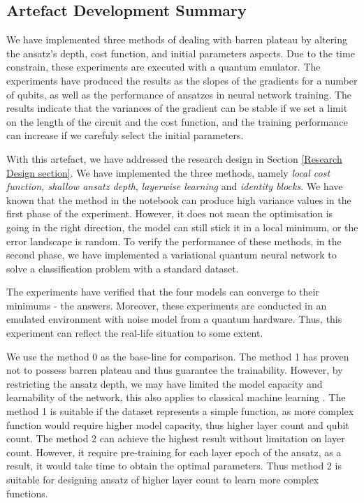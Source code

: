 \subsection{Artefact Development Summary}
We have implemented three methods of dealing with barren plateau by altering the ansatz's depth, cost function, and initial parameters aspects.
Due to the time constrain, these experiments are executed with a quantum emulator.
The experiments have produced the results as the slopes of the gradients for a number of qubits, as well as the performance of ansatzes in neural network training.
The results indicate that the variances of the gradient can be stable if we set a limit on the length of the circuit and the cost function, and the training performance can increase if we carefuly select the initial parameters.

With this artefact, we have addressed the research design in Section \ref{Research Design section}.
We have implemented the three methods, namely \textit{local cost function, shallow ansatz depth}, \textit{layerwise learning} and \textit{identity blocks}.
We have known that the method in the notebook can produce high variance values in the first phase of the experiment.
However, it does not mean the optimisation is going in the right direction, the model can still stick it in a local minimum, or the error landscape is random.
To verify the performance of these methods, in the second phase, we have implemented a variational quantum neural network to solve a classification problem with a standard dataset.

The experiments have verified that the four models can converge to their minimums - the answers.
Moreover, these experiments are conducted in an emulated environment with noise model from a quantum hardware.
Thus, this experiment can reflect the real-life situation to some extent.

We use the method 0 as the base-line for comparison.
The method 1 has proven not to possess barren plateau and thus guarantee the trainability.
However, by restricting the ansatz depth, we may have limited the model capacity and learnability of the network, this also applies to classical machine learning \cite{ianDeepLearningAdaptive2016}.
The method 1 is suitable if the dataset represents a simple function, as more complex function would require higher model capacity, thus higher layer count and qubit count.
The method 2 can achieve the highest result without limitation on layer count.
However, it require pre-training for each layer epoch of the ansatz, as a result, it would take time to obtain the optimal parameters.
Thus method 2 is suitable for designing ansatz of higher layer count to learn more complex functions.


